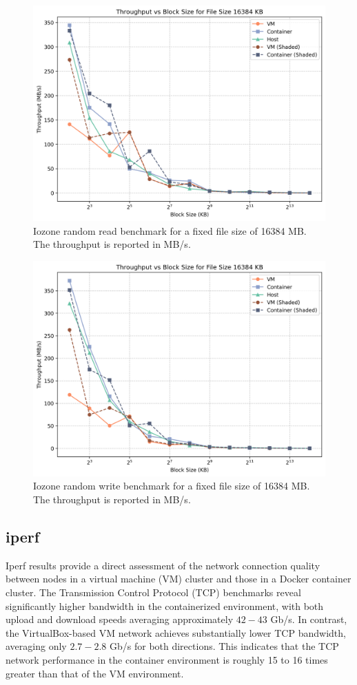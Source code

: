 \begin{figure}
    \centering
    \includegraphics[width=0.8\linewidth]{assets/random read_filesize_16384.png}
    \caption{Iozone random read benchmark for a fixed file size of 16384 MB. The throughput is reported in MB/s.}
    \label{fig:random_read_filesize_1024}
\end{figure}

\begin{figure}
    \centering
    \includegraphics[width=0.8\linewidth]{assets/random write_filesize_16384.png}
    \caption{Iozone random write benchmark for a fixed file size of 16384 MB. The throughput is reported in MB/s.}
    \label{fig:random_write_filesize_1024}
\end{figure}

\subsection{iperf}

Iperf results provide a direct assessment of the network connection quality between nodes in a virtual machine (VM) cluster and those in a Docker container cluster. The Transmission Control Protocol (TCP) benchmarks reveal significantly higher bandwidth in the containerized environment, with both upload and download speeds averaging approximately $42-43$ Gb/s. In contrast, the VirtualBox-based VM network achieves substantially lower TCP bandwidth, averaging only $2.7-2.8$ Gb/s for both directions. This indicates that the TCP network performance in the container environment is roughly 15 to 16 times greater than that of the VM environment.

